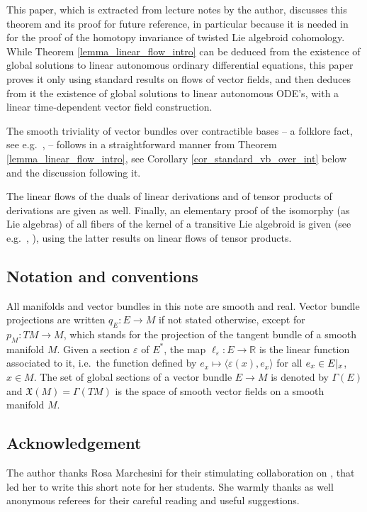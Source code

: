\documentclass{amsart}
\theoremstyle{plain}
\newcommand{\R}{\mathbb{R}}
\newcommand{\mx}{\mathfrak{X}}
\begin{document}
This paper, which is extracted from lecture notes by the author, discusses this theorem and its proof for future reference, in particular because it is needed in \cite{JoMa24} for the proof of the homotopy invariance of twisted Lie algebroid cohomology. While Theorem \ref{lemma_linear_flow_intro} can be deduced from the existence of global solutions to linear autonomous ordinary differential equations, this paper proves it only using standard results on flows of vector fields, and then deduces from it the existence of global solutions to linear autonomous ODE's, with a linear time-dependent vector field construction.



The smooth triviality of vector bundles over contractible bases -- a folklore fact, see e.g.~\cite[Lemma 2.5]{HoMe21}, \cite[Corollary 15.10]{Gloeckner22} -- follows in a straightforward manner from Theorem 
\ref{lemma_linear_flow_intro}, see Corollary \ref{cor_standard_vb_over_int} below and the discussion following it. 

The linear flows of the duals of linear derivations and of tensor products of derivations are given as well. Finally, an elementary proof 
of the isomorphy (as Lie algebras) of all fibers of the kernel of a transitive Lie algebroid is given (see e.g.~\cite[Theorem 6.5.1]{Mackenzie05}, \cite[Proposition 3.6]{Meinrenken21}), using the latter results on linear flows of tensor products.





\subsection*{Notation and conventions}

  All manifolds and vector bundles in this note are smooth and real.
  Vector bundle projections are written $q_E\colon E\to M$ if not stated otherwise, except for  $p_M\colon TM\to M$, which stands for the projection of the tangent bundle of a smooth manifold $M$.  Given a section
  $\varepsilon$ of $E^*$, the map $\ell_\varepsilon\colon E\to \R$ is
  the linear function associated to it, i.e.~the function defined by
  $e_x\mapsto \langle \varepsilon(x), e_x\rangle$ for all $e_x\in E\arrowvert_{x}$, $x\in M$.
  The set of global sections of a vector bundle $E\to M$ is denoted by
  $\Gamma(E)$ and $\mx(M)=\Gamma(TM)$ is the space of smooth vector fields on a
  smooth manifold $M$.



\subsection*{Acknowledgement}
The author thanks Rosa Marchesini for their stimulating collaboration on \cite{JoMa24}, that led her to write this short note for her students.
She  warmly thanks as well anonymous referees
for their careful reading and useful suggestions.
\end{document}
